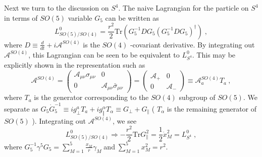 \documentclass[12pt,a4paper]{article}
\begin{document}
Next we turn to the discussion on $S^{4}$. The naive Lagrangian for the
particle on $S^{4}$ in terms of $SO(5)$ variable $G_{5}$ can be written as 
\begin{equation}
L_{SO(5)/SO(4)}^{0}=\frac{{r}^{2}}{2}\mathrm{Tr}\left(
G_{5}^{-1}DG_{5}\left( G_{5}^{-1}DG_{5}\right) ^{\dag }\right) \;,
\end{equation}
where $D\equiv \displaystyle\frac{d}{dt}+i\mathcal{A}^{SO(4)}$ is the $SO(4)$%
-covariant derivative. By integrating out $\mathcal{A}^{SO(4)}$, this
Lagrangian can be seen to be equivalent to $L_{S^{4}}^{0}$. This may be
explicitly shown in the representation such as 
\begin{equation}
\mathcal{A}^{SO(4)}=\left( 
\begin{array}{cc}
\mathcal{A}_{\mu \nu }\sigma _{\mu \nu } & 0 \\ 
0 & \mathcal{A}_{\mu \nu }\bar{\sigma}_{\mu \nu }
\end{array}
\right) =\left( 
\begin{array}{cc}
\mathcal{A}_{+} & 0 \\ 
0 & \mathcal{A}_{-}
\end{array}
\right) \equiv \mathcal{A}_{a}^{SO(4)}T_{a}\ ,
\end{equation}
where $T_{a}$ is the generator corresponding to the $SO(4)$ subgroup of $%
SO(5)$. We separate as $G_{5}\dot{G}_{5}^{-1}\equiv ig_{\bot
}^{a}T_{a}+ig_{\Vert }^{\alpha }T_{\alpha }\equiv G_{\bot }+G_{\Vert }$ ( $%
T_{\alpha }$ is the remaining generator of $SO(5)$ ). Integrating out $%
\mathcal{A}^{SO(4)}$, we see 
\begin{equation}
L_{SO(5)/SO(4)}^{0}\Rightarrow -{\frac{r^{2}}{2}}\mathrm{Tr}G_{\Vert }^{2}=%
\frac{1}{2}\dot{x}_{M}^{2}=L_{S^{4}}^{0}\;,
\end{equation}
where $G_{5}^{-1}\gamma ^{5}G_{5}=\displaystyle\sum_{M=1}^{5}\displaystyle%
\frac{x_{M}}{r}\gamma _{M}\;$and$\;\displaystyle%
\sum_{M=1}^{5}x_{M}^{2}=r^{2} $.
\end{document}
